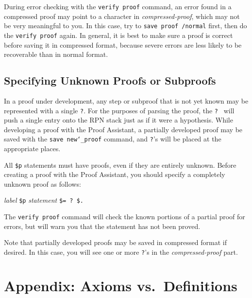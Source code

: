 During error checking with the \texttt{verify proof} command, an error
found in a compressed proof may point to a character in {\em
compressed-proof}, which may not be very meaningful to you.  In this
case, try to \texttt{save proof /normal} first, then do the
\texttt{verify proof} again.  In general, it is best to make sure a
proof is correct before saving it in compressed format, because severe
errors are less likely to be recoverable than in normal format.

\subsection{Specifying Unknown Proofs or Subproofs}\label{unknown}

In a proof under development, any step or subproof that is not yet known
may be represented with a single \texttt{?}.  For the purposes of
parsing the proof, the \texttt{?}\ \index{\texttt{]}@\texttt{?}\ inside
proofs} will push a single entry onto the RPN stack just as if it were a
hypothesis.  While developing a proof with the Proof
Assistant, a partially developed proof may be
saved with the \texttt{save new{\char`\_}proof} command, and \texttt{?}'s will be placed at
the appropriate places.

All \texttt{\$p} statements must have
proofs, even if they are entirely unknown.  Before creating a proof with
the Proof Assistant, you should specify a completely unknown proof as
follows:
\begin{center}
  {\em label} \texttt{\$p} {\em statement} \texttt{\$= ?\ \$.}
\end{center}
\index{\texttt{]}@\texttt{?}\ inside proofs}

The \texttt{verify proof} command
will check the known portions of a partial proof for errors, but will
warn you that the statement has not been proved.

Note that partially developed proofs may be saved in compressed format
if desired.  In this case, you will see one or more \texttt{?}'s in the
{\em compressed-proof} part.

\section{Appendix:  Axioms vs.\ Definitions}\label{definitions}

